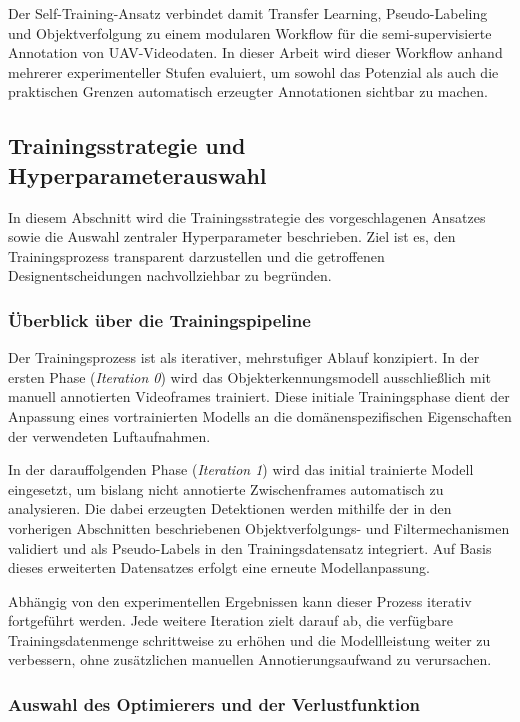 Der Self-Training-Ansatz verbindet damit Transfer Learning, Pseudo-Labeling und
Objektverfolgung zu einem modularen Workflow für die semi-supervisierte
Annotation von UAV-Videodaten. In dieser Arbeit wird dieser Workflow anhand
mehrerer experimenteller Stufen evaluiert, um sowohl das Potenzial als auch die
praktischen Grenzen automatisch erzeugter Annotationen sichtbar zu machen.

\subsection{Trainingsstrategie und Hyperparameterauswahl}

In diesem Abschnitt wird die Trainingsstrategie des vorgeschlagenen Ansatzes sowie
die Auswahl zentraler Hyperparameter beschrieben. Ziel ist es, den Trainingsprozess
transparent darzustellen und die getroffenen Designentscheidungen nachvollziehbar
zu begründen.

\subsubsection{Überblick über die Trainingspipeline}

Der Trainingsprozess ist als iterativer, mehrstufiger Ablauf konzipiert. In der
ersten Phase (\textit{Iteration 0}) wird das Objekterkennungsmodell ausschließlich
mit manuell annotierten Videoframes trainiert. Diese initiale Trainingsphase dient
der Anpassung eines vortrainierten Modells an die domänenspezifischen Eigenschaften
der verwendeten Luftaufnahmen.

In der darauffolgenden Phase (\textit{Iteration 1}) wird das initial trainierte
Modell eingesetzt, um bislang nicht annotierte Zwischenframes automatisch zu
analysieren. Die dabei erzeugten Detektionen werden mithilfe der in den vorherigen
Abschnitten beschriebenen Objektverfolgungs- und Filtermechanismen validiert und
als Pseudo-Labels in den Trainingsdatensatz integriert. Auf Basis dieses erweiterten
Datensatzes erfolgt eine erneute Modellanpassung.

Abhängig von den experimentellen Ergebnissen kann dieser Prozess iterativ
fortgeführt werden. Jede weitere Iteration zielt darauf ab, die verfügbare
Trainingsdatenmenge schrittweise zu erhöhen und die Modellleistung weiter zu
verbessern, ohne zusätzlichen manuellen Annotierungsaufwand zu verursachen.

\subsubsection{Auswahl des Optimierers und der Verlustfunktion}

